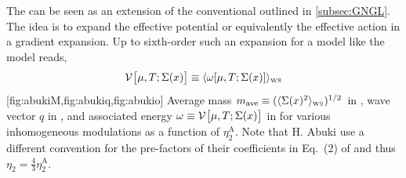 The \ggla{} can be seen as an extension of the conventional \gla{} outlined in \cref{subsec:GNGL}.
The idea is to expand the effective potential or equivalently the effective action in a gradient expansion. 
Up to sixth-order such an expansion for a model like the \gn{} model reads,
\begin{align}
	\VeffFArgs{\muT;\smin (\ex )}\equiv\langle\omega[\muT;\smin (\ex )]\rangle_{\scriptscriptstyle{\mathrm{WS}}} \label{eq:Vggl}
\end{align}\clearpage
{}%
	[fig:abukiM,fig:abukiq,fig:abukio]%
	{%
		Average mass $m_\mathrm{ave}\equiv (\langle \Sigma (x )^2\rangle_{\scriptscriptstyle{\mathrm{WS}}})^{1/2}$ in , wave vector $q$ in , and associated energy $\omega\equiv \VeffFArgs{\muT;\smin (\ex )}$ in  for various inhomogeneous modulations as a function of $\eta_2^\mathrm{A}$. Note that H. Abuki \etal{} use a different convention for the pre-factors of their \ggl{} coefficients in Eq.~(2) of  and thus $\eta_2=\frac{4}{3}\eta_2^\mathrm{A}$.
	}%
